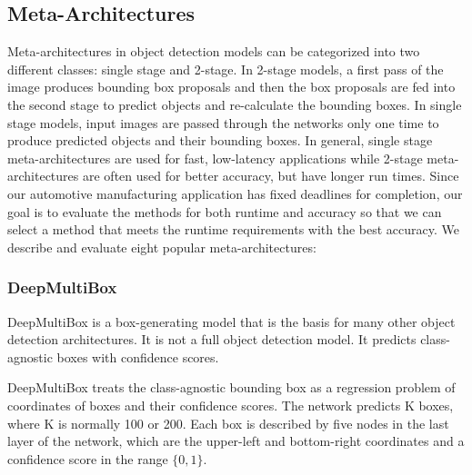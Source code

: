 \documentclass[conference]{IEEEtran}
\newcommand{\alnote}[1]{ {\textcolor{blue} { ***andre: #1 }}}
\newcommand{\dungnote}[1]{ {\textcolor{orange} { ***dung: #1 }}}
\newcommand{\alnote}[1]{}
\newcommand{\dungnote}[1]{}
\begin{document}


\subsection{Meta-Architectures}


Meta-architectures in object detection models can be categorized into two different classes: single stage and 2-stage. In 2-stage models, a first pass of the image produces bounding box proposals and then the box proposals are fed into the second stage to predict objects and re-calculate the bounding boxes. 
In single stage models, input images are passed through the networks only one time to produce predicted objects and their bounding boxes.  
In general, single stage meta-architectures are used for fast, low-latency applications while 2-stage meta-architectures are often used for better accuracy, but have longer run times.  
Since our automotive manufacturing application has fixed deadlines for completion, our goal is to evaluate the methods for both runtime and accuracy so that we can select a method that meets the runtime requirements with the best accuracy.
We describe and evaluate eight popular meta-architectures:

\subsubsection{DeepMultiBox}
DeepMultiBox is a box-generating model that is the basis for many other object detection architectures. It is not a full object detection model. It predicts class-agnostic boxes with confidence scores.

DeepMultiBox treats the class-agnostic bounding box as a regression problem of coordinates of boxes and their confidence scores. The network predicts K boxes, where K is normally 100 or 200. Each box is described by five nodes in the last layer of the network, which are the upper-left and bottom-right coordinates and a confidence score in the range $\{0, 1\}$.
\end{document}
